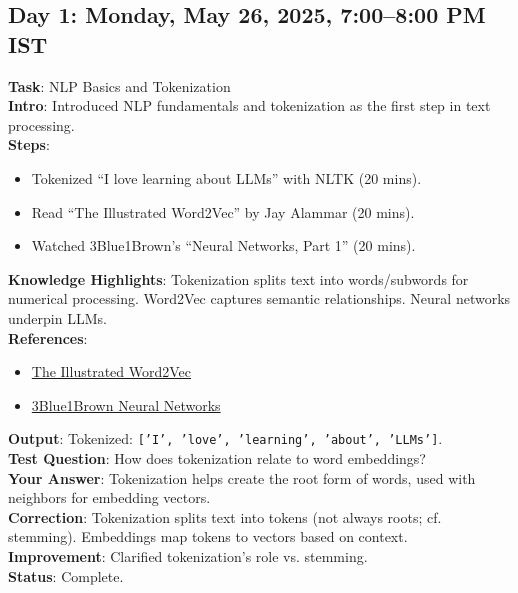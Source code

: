 \documentclass[a4paper,12pt]{article}
\begin{document}
\subsection*{Day 1: Monday, May 26, 2025, 7:00--8:00 PM IST}
\textbf{Task}: NLP Basics and Tokenization \\
\textbf{Intro}: Introduced NLP fundamentals and tokenization as the first step in text processing. \\
\textbf{Steps}:
\begin{itemize}
    \item Tokenized ``I love learning about LLMs'' with NLTK (20 mins).
    \item Read ``The Illustrated Word2Vec'' by Jay Alammar (20 mins).
    \item Watched 3Blue1Brown’s ``Neural Networks, Part 1'' (20 mins).
\end{itemize}
\textbf{Knowledge Highlights}: Tokenization splits text into words/subwords for numerical processing. Word2Vec captures semantic relationships. Neural networks underpin LLMs. \\
\textbf{References}: 
\begin{itemize}
    \item \href{https://jalammar.github.io/illustrated-word2vec}{The Illustrated Word2Vec}
    \item \href{https://www.youtube.com/@3blue1brown}{3Blue1Brown Neural Networks}
\end{itemize}
\textbf{Output}: Tokenized: \texttt{['I', 'love', 'learning', 'about', 'LLMs']}. \\
\textbf{Test Question}: How does tokenization relate to word embeddings? \\
\textbf{Your Answer}: Tokenization helps create the root form of words, used with neighbors for embedding vectors. \\
\textbf{Correction}: Tokenization splits text into tokens (not always roots; cf. stemming). Embeddings map tokens to vectors based on context. \\
\textbf{Improvement}: Clarified tokenization’s role vs. stemming. \\
\textbf{Status}: Complete.

\end{document}
